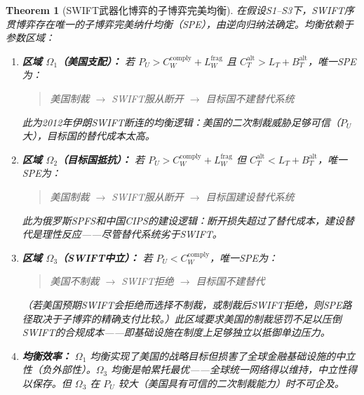\documentclass[12pt,a4paper]{ctexart}
\newtheorem{theorem}{Theorem}[section]
\theoremstyle{definition}
\theoremstyle{remark}
\begin{document}
\begin{theorem}[SWIFT武器化博弈的子博弈完美均衡]
\label{thm:swift-spe}
在假设S1--S3下，SWIFT序贯博弈存在唯一的子博弈完美纳什均衡（SPE），由逆向归纳法确定。均衡依赖于参数区域：

\begin{enumerate}[label=(\roman*), itemsep=6pt]
\item \textbf{区域 $\Omega_1$（美国支配）：} 若 $P_U > C_W^{\text{comply}} + L_W^{\text{frag}}$ 且 $C_T^{\text{alt}} > L_T + B_T^{\text{alt}}$，唯一SPE为：
\begin{quote}
美国制裁 $\to$ SWIFT服从断开 $\to$ 目标国不建替代系统
\end{quote}
此为2012年伊朗SWIFT断连的均衡逻辑：美国的二次制裁威胁足够可信（$P_U$ 大），目标国的替代成本太高。

\item \textbf{区域 $\Omega_2$（目标国抵抗）：} 若 $P_U > C_W^{\text{comply}} + L_W^{\text{frag}}$ 但 $C_T^{\text{alt}} < L_T + B_T^{\text{alt}}$，唯一SPE为：
\begin{quote}
美国制裁 $\to$ SWIFT服从断开 $\to$ 目标国建设替代系统
\end{quote}
此为俄罗斯SPFS和中国CIPS的建设逻辑：断开损失超过了替代成本，建设替代是理性反应——尽管替代系统劣于SWIFT。

\item \textbf{区域 $\Omega_3$（SWIFT中立）：} 若 $P_U < C_W^{\text{comply}}$，唯一SPE为：
\begin{quote}
美国不制裁 $\to$ SWIFT拒绝 $\to$ 目标国不建替代
\end{quote}
（若美国预期SWIFT会拒绝而选择不制裁，或制裁后SWIFT拒绝，则SPE路径取决于子博弈的精确支付比较。）此区域要求美国的制裁惩罚不足以压倒SWIFT的合规成本——即基础设施在制度上足够独立以抵御单边压力。

\item \textbf{均衡效率：} $\Omega_1$ 均衡实现了美国的战略目标但损害了全球金融基础设施的中立性（负外部性）。$\Omega_3$ 均衡是帕累托最优——全球统一网络得以维持，中立性得以保存。但 $\Omega_3$ 在 $P_U$ 较大（美国具有可信的二次制裁能力）时不可企及。
\end{enumerate}
\end{theorem}
\end{document}
